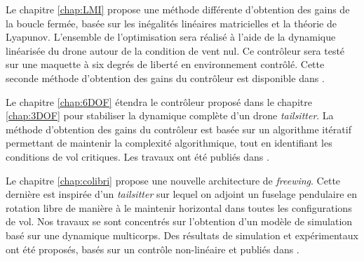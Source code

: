 Le chapitre \ref{chap:LMI} propose une méthode différente d'obtention des gains de la boucle fermée, basée sur les inégalités linéaires matricielles et la théorie de Lyapunov. L'ensemble de l'optimisation sera réalisé à l'aide de la dynamique linéarisée du drone autour de la condition de vent nul. Ce contrôleur sera testé sur une maquette à six degrés de liberté en environnement contrôlé. Cette seconde méthode d'obtention des gains du contrôleur est disponible dans \cite{a_curpanaru_et_al}.


Le chapitre \ref{chap:6DOF} étendra le contrôleur proposé dans le chapitre \ref{chap:3DOF} pour stabiliser la dynamique complète d'un drone \textit{tailsitter}. La méthode d'obtention des gains du contrôleur est basée sur un algorithme itératif permettant de maintenir la complexité algorithmique, tout en identifiant les conditions de vol critiques. Les travaux ont été publiés dans \cite{sansouTCST}.

Le chapitre \ref{chap:colibri} propose une nouvelle architecture de \textit{freewing}. Cette dernière est inspirée d'un \textit{tailsitter} sur lequel on adjoint un fuselage pendulaire en rotation libre de manière à le maintenir horizontal dans toutes les configurations de vol. Nos travaux se sont concentrés sur l'obtention d'un modèle de simulation basé sur une dynamique multicorps. Des résultats de simulation et expérimentaux ont été proposés, basés sur un contrôle non-linéaire et publiés dans \cite{sansouICUAS}.


